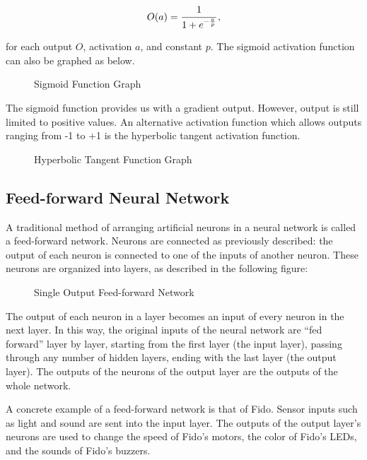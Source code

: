 \begin{equation}
	O(a) = \cfrac{1}{1+e^{-\frac{a}{p}}}
	\,,
\end{equation}

\noindent for each output $O$, activation $a$, and constant $p$. The sigmoid activation function can also be graphed as below.

\begin{figure}[ht]
	\centering
	
	\caption{Sigmoid Function Graph}
\end{figure}

The sigmoid function provides us with a gradient output. However, output is still limited to positive values. An alternative activation function which allows outputs ranging from -1 to +1 is the hyperbolic tangent activation function.

\begin{figure}[ht]
	\centering
	
	\caption{Hyperbolic Tangent Function Graph}
\end{figure}

\subsection{Feed-forward Neural Network}

A traditional method of arranging artificial neurons in a neural network is called a feed-forward network. Neurons are connected as previously described: the output of each neuron is connected to one of the inputs of another neuron. These neurons are organized into layers, as described in the following figure:

\begin{figure}[ht]
	\centering
	
	\caption{Single Output Feed-forward Network}
\end{figure}

The output of each neuron in a layer becomes an input of every neuron in the next layer. In this way, the original inputs of the neural network are ``fed forward'' layer by layer, starting from the first layer (the input layer), passing through any number of hidden layers, ending with the last layer (the output layer). The outputs of the neurons of the output layer are the outputs of the whole network.

A concrete example of a feed-forward network is that of Fido. Sensor inputs such as light and sound are sent into the input layer. The outputs of the output layer's neurons are used to change the speed of Fido's motors, the color of Fido's LEDs, and the sounds of Fido's buzzers.

